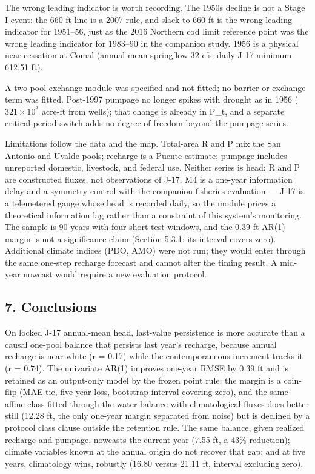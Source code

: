 \documentclass[11pt]{article}
\begin{document}
The wrong leading indicator is worth recording. The 1950s decline is not
a Stage I event: the 660-ft line is a 2007 rule, and slack to 660 ft is
the wrong leading indicator for 1951--56, just as the 2016 Northern cod
limit reference point was the wrong leading indicator for 1983--90 in
the companion study. 1956 is a physical near-cessation at Comal (annual
mean springflow 32 cfs; daily J-17 minimum 612.51 ft).

A two-pool exchange module was specified and not fitted; no barrier or
exchange term was fitted. Post-1997 pumpage no longer spikes with
drought as in 1956 (\(321 \times 10^3\) acre-ft from wells); that change
is already in P\_t, and a separate critical-period switch adds no degree
of freedom beyond the pumpage series.

Limitations follow the data and the map. Total-area R and P mix the San
Antonio and Uvalde pools; recharge is a Puente estimate; pumpage
includes unreported domestic, livestock, and federal use. Neither series
is head: R and P are constructed fluxes, not observations of J-17. M4 is
a one-year information delay and a symmetry control with the companion
fisheries evaluation --- J-17 is a telemetered gauge whose head is
recorded daily, so the module prices a theoretical information lag
rather than a constraint of this system's monitoring. The sample is 90
years with four short test windows, and the 0.39-ft AR(1) margin is not
a significance claim (Section 5.3.1: its interval covers zero).
Additional climate indices (PDO, AMO) were not run; they would enter
through the same one-step recharge forecast and cannot alter the timing
result. A mid-year nowcast would require a new evaluation protocol.

\subsection{7. Conclusions}\label{conclusions}

On locked J-17 annual-mean head, last-value persistence is more accurate
than a causal one-pool balance that persists last year's recharge,
because annual recharge is near-white (r = 0.17) while the
contemporaneous increment tracks it (r = 0.74). The univariate AR(1)
improves one-year RMSE by 0.39 ft and is retained as an output-only
model by the frozen point rule; the margin is a coin-flip (MAE tie,
five-year loss, bootstrap interval covering zero), and the same affine
class fitted through the water balance with climatological fluxes does
better still (12.28 ft, the only one-year margin separated from noise)
but is declined by a protocol class clause outside the retention rule.
The same balance, given realized recharge and pumpage, nowcasts the
current year (7.55 ft, a 43\% reduction); climate variables known at the
annual origin do not recover that gap; and at five years, climatology
wins, robustly (16.80 versus 21.11 ft, interval excluding zero).
\end{document}
